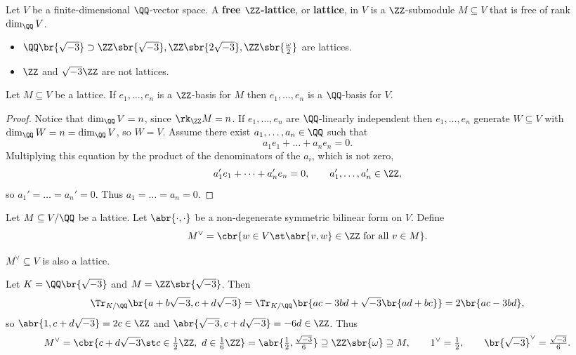 
\begin{definition}
Let $ V $ be a finite-dimensional $ \QQ $-vector space. A \textbf{free $ \ZZ $-lattice}, or \textbf{lattice}, in $ V $ is a $ \ZZ $-submodule $ M \subseteq V $ that is free of rank $ \dim_\QQ V $.
\end{definition}

\begin{example*}
\hfill
\begin{itemize}
\item $ \QQ\br{\sqrt{-3}} \supset \ZZ\sbr{\sqrt{-3}}, \ZZ\sbr{2\sqrt{-3}}, \ZZ\sbr{\tfrac{\omega}{2}} $ are lattices.
\item $ \ZZ $ and $ \sqrt{-3}\ZZ $ are not lattices.
\end{itemize}
\end{example*}

\begin{lemma}
Let $ M \subseteq V $ be a lattice. If $ e_1, \dots, e_n $ is a $ \ZZ $-basis for $ M $ then $ e_1, \dots, e_n $ is a $ \QQ $-basis for $ V $.
\end{lemma}

\begin{proof}
Notice that $ \dim_\QQ V = n $, since $ \rk_\ZZ M = n $. If $ e_1, \dots, e_n $ are $ \QQ $-linearly independent then $ e_1, \dots, e_n $ generate $ W \subseteq V $ with $ \dim_\QQ W = n = \dim_\QQ V $, so $ W = V $. Assume there exist $ a_1, \dots, a_n \in \QQ $ such that
$$ a_1e_1 + \dots + a_ne_n = 0. $$
Multiplying this equation by the product of the denominators of the $ a_i $, which is not zero,
$$ a_1'e_1 + \dots + a_n'e_n = 0, \qquad a_1', \dots, a_n' \in \ZZ, $$
so $ a_1' = \dots = a_n' = 0 $. Thus $ a_1 = \dots = a_n = 0 $.
\end{proof}

Let $ M \subseteq V / \QQ $ be a lattice. Let $ \abr{\cdot, \cdot} $ be a non-degenerate symmetric bilinear form on $ V $. Define
$$ M^\vee = \cbr{w \in V \st \abr{v, w} \in \ZZ \ \text{for all} \ v \in M}. $$

\begin{proposition}
\label{prop:duallattice}
$ M^\vee \subseteq V $ is also a lattice.
\end{proposition}

\begin{example*}
Let $ K = \QQ\br{\sqrt{-3}} $ and $ M = \ZZ\sbr{\sqrt{-3}} $. Then
$$ \Tr_{K / \QQ}\br{a + b\sqrt{-3}, c + d\sqrt{-3}} = \Tr_{K / \QQ} \br{ac - 3bd + \sqrt{-3}\br{ad + bc}} = 2\br{ac - 3bd}, $$
so $ \abr{1, c + d\sqrt{-3}} = 2c \in \ZZ $ and $ \abr{\sqrt{-3}, c + d\sqrt{-3}} = -6d \in \ZZ $. Thus
$$ M^\vee = \cbr{c + d\sqrt{-3} \st c \in \tfrac{1}{2}\ZZ, \ d \in \tfrac{1}{6}\ZZ} = \abr{\tfrac{1}{2}, \tfrac{\sqrt{-3}}{6}} \supseteq \ZZ\sbr{\omega} \supseteq M, \qquad 1^\vee = \tfrac{1}{2}, \qquad \br{\sqrt{-3}}^\vee = \tfrac{\sqrt{-3}}{6}. $$
\end{example*}

